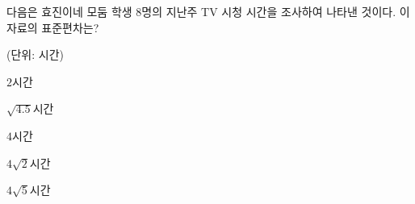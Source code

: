 다음은 효진이네 모둠 학생 $8$명의 지난주 TV 시청 시간을 조사하여 나타낸 것이다. 이 자료의 표준편차는?\par\noindent\hfill{\footnotesize (단위: 시간)}
\begin{choices32}{\rule[-3ex]{0pt}{8ex}$2$시간}{\rule[-3ex]{0pt}{8ex}$\sqrt{4.5}$시간}{\rule[-3ex]{0pt}{8ex}$4$시간}{\rule[-3ex]{0pt}{8ex}$4\sqrt{2}$시간}{\rule[-3ex]{0pt}{8ex}$4\sqrt{5}$시간}\end{choices32}
